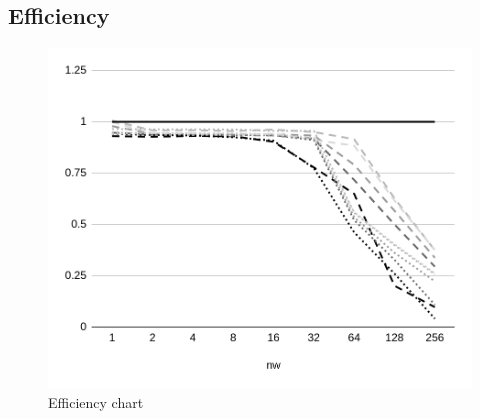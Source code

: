 \subsection{Efficiency}
\begin{figure}[H]
    \centering
    \includegraphics[width=.8\linewidth]{assets/efficiency_ideal}
    \caption{Efficiency chart}
    \label{fig:efficiency}
\end{figure}